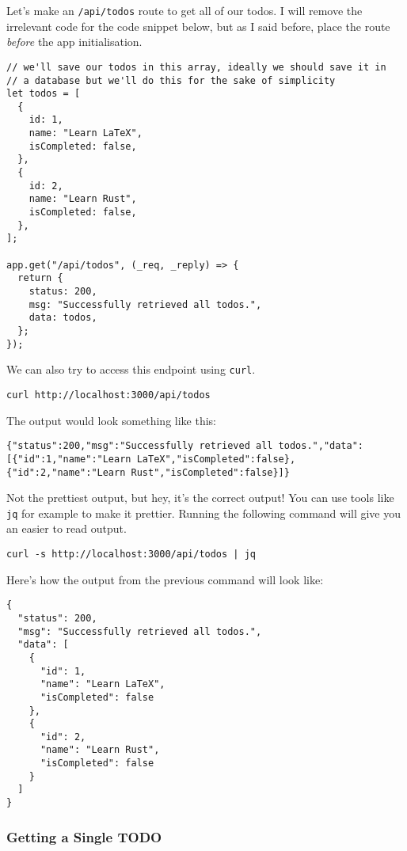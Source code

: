 \documentclass[a4paper,14pt,titlepage]{article}
\def\c#1{\texttt{#1}}
\begin{document}
Let's make an \texttt{/api/todos} route to get all of
our todos. I will remove the irrelevant code for the code snippet below, but
as I said before, place the route \textit{before} the app initialisation.

\begin{verbatim}
// we'll save our todos in this array, ideally we should save it in
// a database but we'll do this for the sake of simplicity
let todos = [
  {
    id: 1,
    name: "Learn LaTeX",
    isCompleted: false,
  },
  {
    id: 2,
    name: "Learn Rust",
    isCompleted: false,
  },
];

app.get("/api/todos", (_req, _reply) => {
  return {
    status: 200,
    msg: "Successfully retrieved all todos.",
    data: todos,
  };
});
\end{verbatim}

We can also try to access this endpoint using \c{curl}.

\begin{verbatim}
curl http://localhost:3000/api/todos
\end{verbatim}

The output would look something like this:

\begin{verbatim}
{"status":200,"msg":"Successfully retrieved all todos.","data":[{"id":1,"name":"Learn LaTeX","isCompleted":false},{"id":2,"name":"Learn Rust","isCompleted":false}]}
\end{verbatim}

Not the prettiest output, but hey, it's the correct output! You can use tools like
\c{jq} for example to make it prettier. Running the following command will
give you an easier to read output.

\begin{verbatim}
curl -s http://localhost:3000/api/todos | jq
\end{verbatim}

\newpage

Here's how the output from the previous command will look like:

\begin{verbatim}
{
  "status": 200,
  "msg": "Successfully retrieved all todos.",
  "data": [
    {
      "id": 1,
      "name": "Learn LaTeX",
      "isCompleted": false
    },
    {
      "id": 2,
      "name": "Learn Rust",
      "isCompleted": false
    }
  ]
}
\end{verbatim}

\subsubsection{Getting a Single TODO}
\end{document}
